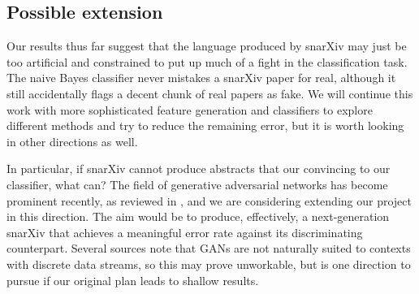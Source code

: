 \documentclass{article}
\begin{document}
\subsection{Possible extension}
Our results thus far suggest that the language produced by snarXiv may just be too artificial and constrained to put up much of a fight in the classification task.
The naive Bayes classifier never mistakes a snarXiv paper for real, although it still accidentally flags a decent chunk of real papers as fake.
We will continue this work with more sophisticated feature generation and classifiers to explore different methods and try to reduce the remaining error, but it is worth looking in other directions as well.

In particular, if snarXiv cannot produce abstracts that our convincing to our classifier, what can?
The field of generative adversarial networks has become prominent recently, as reviewed in \citet{creswell2018generative}, and we are considering extending our project in this direction.
The aim would be to produce, effectively, a next-generation snarXiv that achieves a meaningful error rate against its discriminating counterpart.
Several sources note that GANs are not naturally suited to contexts with discrete data streams, so this may prove unworkable, but is one direction to pursue if our original plan leads to shallow results.



\nocite{*}



\end{document}
